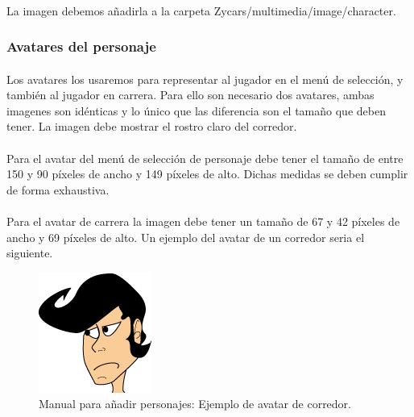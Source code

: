 \paragraph{}
La imagen debemos añadirla a la carpeta Zycars/multimedia/image/character.

\subsubsection{Avatares del personaje}

\paragraph{}
Los avatares los usaremos para representar al jugador en el menú de selección, y también al jugador en carrera. Para ello son 
necesario dos avatares, ambas imagenes son idénticas y lo único que las diferencia son el tamaño que deben tener. La imagen debe
mostrar el rostro claro del corredor.

\paragraph{}
Para el avatar del menú de selección de personaje debe tener el tamaño de entre 150 y 90 píxeles de ancho y 149 píxeles de alto. 
Dichas medidas se deben cumplir de forma exhaustiva.

\paragraph{}
Para el avatar de carrera la imagen debe tener un tamaño de 67 y 42 píxeles de ancho y 69 píxeles de alto. Un ejemplo del avatar de 
un corredor seria el siguiente.

\begin{figure}[H]
  \label{ejemplo_avatar}
  \begin{center}
    \includegraphics[scale=0.7]{imagenes/ejemplo_avatar.png}
  \end{center}
  \caption{Manual para añadir personajes: Ejemplo de avatar de corredor.}
\end{figure}

